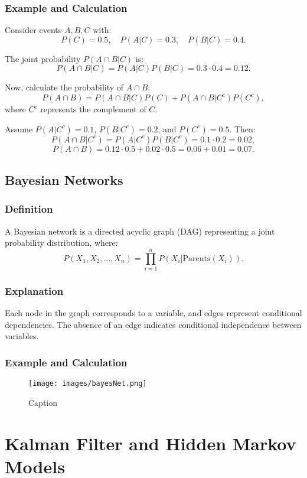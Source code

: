 \documentclass[12pt,a4paper]{article}
\begin{document}
\subsubsection{Example and Calculation}
Consider events $A, B, C$ with:
\[
P(C) = 0.5, \quad P(A | C) = 0.3, \quad P(B | C) = 0.4.
\]

The joint probability $P(A \cap B | C)$ is:
\[
P(A \cap B | C) = P(A | C) P(B | C) = 0.3 \cdot 0.4 = 0.12.
\]

Now, calculate the probability of $A \cap B$:
\[
P(A \cap B) = P(A \cap B | C)P(C) + P(A \cap B | C^c)P(C^c),
\]
where $C^c$ represents the complement of $C$.

Assume $P(A | C^c) = 0.1$, $P(B | C^c) = 0.2$, and $P(C^c) = 0.5$. Then:
\[
P(A \cap B | C^c) = P(A | C^c) P(B | C^c) = 0.1 \cdot 0.2 = 0.02,
\]
\[
P(A \cap B) = 0.12 \cdot 0.5 + 0.02 \cdot 0.5 = 0.06 + 0.01 = 0.07.
\]

\subsection{Bayesian Networks}
\subsubsection{Definition}
A Bayesian network is a directed acyclic graph (DAG) representing a joint probability distribution, where:
\[
P(X_1, X_2, \ldots, X_n) = \prod_{i=1}^n P(X_i | \text{Parents}(X_i)).
\]

\subsubsection{Explanation}
Each node in the graph corresponds to a variable, and edges represent conditional dependencies. The absence of an edge indicates conditional independence between variables.

\subsubsection{Example and Calculation}
\begin{figure}[h!]
    \centering
    \texttt{[image: images/bayesNet.png]}
    \caption{Caption}
    \label{fig:enter-label}
\end{figure}

\section{Kalman Filter and Hidden Markov Models}
\end{document}
